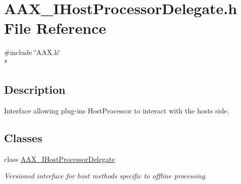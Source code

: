 \hypertarget{a00250}{}\section{A\+A\+X\+\_\+\+I\+Host\+Processor\+Delegate.\+h File Reference}
\label{a00250}
{\ttfamily \#include \char`\"{}A\+A\+X.\+h\char`\"{}}\\*


\subsection{Description}
Interface allowing plug-\/in\textquotesingle{}s Host\+Processor to interact with the host\textquotesingle{}s side. 

\subsection*{Classes}
\begin{DoxyCompactItemize}
\item 
class \hyperlink{a00102}{A\+A\+X\+\_\+\+I\+Host\+Processor\+Delegate}
\begin{DoxyCompactList}\small\item\em Versioned interface for host methods specific to offline processing. \end{DoxyCompactList}\end{DoxyCompactItemize}
